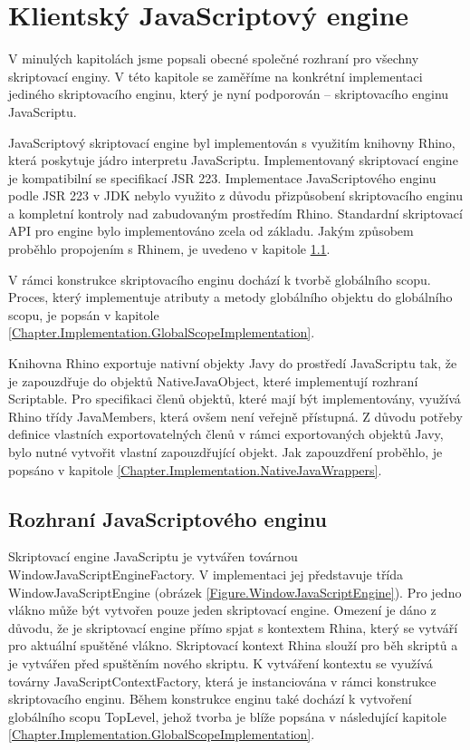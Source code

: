\section{Klientský JavaScriptový engine}
\label{Chapter.Implementation.JavaScriptEngine}

V minulých kapitolách jsme popsali obecné společné rozhraní pro všechny skriptovací enginy. V této kapitole se zaměříme na konkrétní implementaci jediného skriptovacího enginu, který je nyní podporován -- skriptovacího enginu JavaScriptu.

JavaScriptový skriptovací engine byl implementován s využitím knihovny Rhino, která poskytuje jádro interpretu JavaScriptu. Implementovaný skriptovací engine je kompatibilní se specifikací JSR 223. Implementace JavaScriptového enginu podle JSR 223 v JDK nebylo využito z důvodu přizpůsobení skriptovacího enginu a kompletní kontroly nad zabudovaným prostředím Rhino. Standardní skriptovací API pro engine bylo implementováno zcela od základu. Jakým způsobem proběhlo propojením s Rhinem, je uvedeno v kapitole \ref{Chapter.Implementation.JavaScriptEngineInterface}.

V rámci konstrukce skriptovacího enginu dochází k tvorbě globálního scopu. Proces, který implementuje atributy a metody globálního objektu do globálního scopu, je popsán v kapitole \ref{Chapter.Implementation.GlobalScopeImplementation}. 

Knihovna Rhino exportuje nativní objekty Javy do prostředí JavaScriptu tak, že je zapouzdřuje do objektů NativeJavaObject, které implementují rozhraní Scriptable. Pro specifikaci členů objektů, které mají být implementovány, využívá Rhino třídy JavaMembers, která ovšem není veřejně přístupná. Z důvodu potřeby definice vlastních exportovatelných členů v rámci exportovaných objektů Javy, bylo nutné vytvořit vlastní zapouzdřující objekt. Jak zapouzdření proběhlo, je popsáno v kapitole \ref{Chapter.Implementation.NativeJavaWrappers}.

\subsection{Rozhraní JavaScriptového enginu}
\label{Chapter.Implementation.JavaScriptEngineInterface}

Skriptovací engine JavaScriptu je vytvářen továrnou WindowJavaScriptEngineFactory. V implementaci jej představuje třída WindowJavaScriptEngine (obrázek \ref{Figure.WindowJavaScriptEngine}). Pro jedno vlákno může být vytvořen pouze jeden skriptovací engine. Omezení je dáno z důvodu, že je skriptovací engine přímo spjat s kontextem Rhina, který se vytváří pro aktuální spuštěné vlákno. Skriptovací kontext Rhina slouží pro běh skriptů a je vytvářen před spuštěním nového skriptu. K vytváření kontextu se využívá továrny JavaScriptContextFactory, která je instanciována v rámci konstrukce skriptovacího enginu. Během konstrukce enginu také dochází k vytvoření globálního scopu TopLevel, jehož tvorba je blíže popsána v následující kapitole \ref{Chapter.Implementation.GlobalScopeImplementation}.

